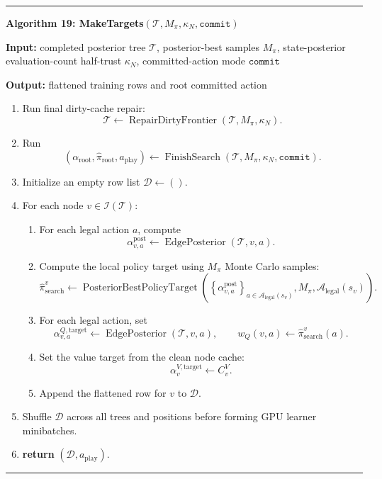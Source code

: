 \documentclass[11pt]{article}
\newcommand{\Tree}{\mathcal{T}}
\newcommand{\Legal}{\mathcal{A}_{\mathrm{legal}}}
\newcommand{\Interior}{\mathcal{I}}
\newcommand{\EdgePosterior}{\operatorname{EdgePosterior}}
\newcommand{\PosteriorBestPolicyTarget}{\operatorname{PosteriorBestPolicyTarget}}
\newcommand{\FinishSearch}{\operatorname{FinishSearch}}
\newcommand{\RepairDirtyFrontier}{\operatorname{RepairDirtyFrontier}}
\newenvironment{algorithmblock}[1]
{
  \par\medskip
  \noindent\hrule\par\smallskip
  \noindent\textbf{#1}
  \par\smallskip
}
{
  \par\smallskip\noindent\hrule\par\medskip
}
\newcommand{\Input}{\textbf{Input: }}
\newcommand{\Output}{\textbf{Output: }}
\newcommand{\Return}{\textbf{return }}
\begin{document}
\begin{algorithmblock}{Algorithm 19: MakeTargets\((\Tree,M_\pi,\kappa_N,\texttt{commit})\)}

\Input completed posterior tree \(\Tree\), posterior-best samples \(M_\pi\), state-posterior evaluation-count half-trust \(\kappa_N\), committed-action mode \(\texttt{commit}\)

\Output flattened training rows and root committed action

\begin{enumerate}[leftmargin=2em]
  \item Run final dirty-cache repair:
  \[
  \Tree\gets\RepairDirtyFrontier(\Tree,M_\pi,\kappa_N).
  \]

  \item Run
  \[
  \left(
  \alpha_{\mathrm{root}},
  \hat{\pi}_{\mathrm{root}},
  a_{\mathrm{play}}
  \right)
  \gets
  \FinishSearch(\Tree,M_\pi,\kappa_N,\texttt{commit}).
  \]

  \item Initialize an empty row list \(\mathcal{D}\gets()\).

  \item For each node \(v\in\Interior(\Tree)\):

  \begin{enumerate}[leftmargin=2em]
    \item For each legal action \(a\), compute
    \[
    \alpha^{\mathrm{post}}_{v,a}
    \gets
    \EdgePosterior(\Tree,v,a).
    \]

    \item Compute the local policy target using \(M_\pi\) Monte Carlo samples:
    \[
    \hat\pi_{\mathrm{search}}^v
    \gets
    \PosteriorBestPolicyTarget
    \left(
    \left\{\alpha^{\mathrm{post}}_{v,a}\right\}_{a\in\Legal(s_v)},
    M_\pi,
    \Legal(s_v)
    \right).
    \]

    \item For each legal action, set
    \[
    \alpha^{Q,\mathrm{target}}_{v,a}
    \gets
    \EdgePosterior(\Tree,v,a),
    \qquad
    w_Q(v,a)
    \gets
    \hat\pi_{\mathrm{search}}^v(a).
    \]

    \item Set the value target from the clean node cache:
    \[
    \alpha^{V,\mathrm{target}}_v
    \gets
    C^V_v.
    \]

    \item Append the flattened row for \(v\) to \(\mathcal{D}\).
  \end{enumerate}

  \item Shuffle \(\mathcal{D}\) across all trees and positions before forming GPU
  learner minibatches.

  \item \Return \((\mathcal{D},a_{\mathrm{play}})\).
\end{enumerate}

\end{algorithmblock}
\end{document}
